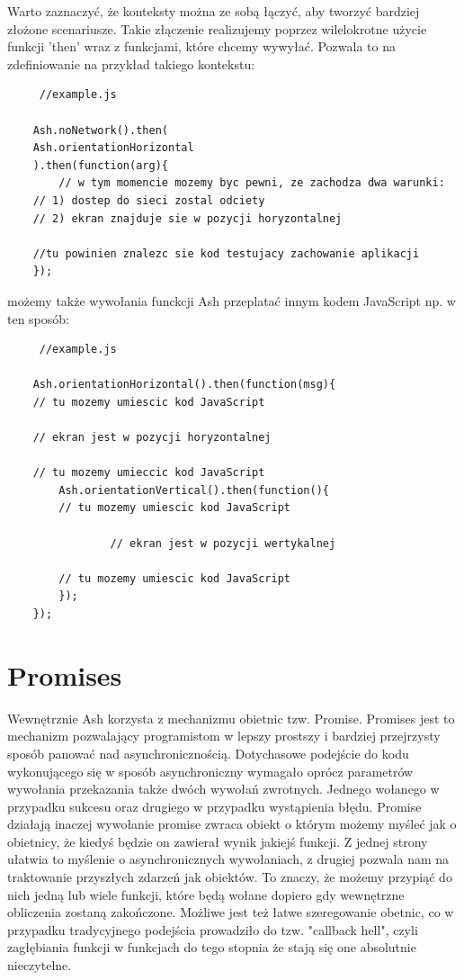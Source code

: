 \documentclass[brudnopis]{xmgr}
\begin{document}
Warto zaznaczyć, że konteksty można ze sobą łączyć, aby tworzyć bardziej złożone scenariusze. Takie złączenie realizujemy poprzez wilelokrotne użycie funkcji 'then' wraz z funkcjami, które chcemy wywyłać. Pozwala to na zdefiniowanie na przykład takiego kontekstu:

\begin{lstlisting}
     //example.js

    Ash.noNetwork().then(
	Ash.orientationHorizontal
    ).then(function(arg){
      	// w tym momencie mozemy byc pewni, ze zachodza dwa warunki:
	// 1) dostep do sieci zostal odciety 
	// 2) ekran znajduje sie w pozycji horyzontalnej

	//tu powinien znalezc sie kod testujacy zachowanie aplikacji 
    });
\end{lstlisting}

możemy także wywołania funckcji Ash przeplatać innym kodem JavaScript np. w ten sposób:

\begin{lstlisting}
     //example.js

    Ash.orientationHorizontal().then(function(msg){
	// tu mozemy umiescic kod JavaScript
      	
	// ekran jest w pozycji horyzontalnej
      
	// tu mozemy umieccic kod JavaScript
      	Ash.orientationVertical().then(function(){
		// tu mozemy umiescic kod JavaScript

        		// ekran jest w pozycji wertykalnej 

		// tu mozemy umiescic kod JavaScript
      	});
    });
\end{lstlisting}

\section{Promises}

Wewnętrznie Ash korzysta z mechanizmu obietnic tzw. Promise. Promises jest to mechanizm pozwalający programistom w lepszy prostszy i bardziej przejrzysty sposób panować nad  asynchronicznością. Dotychasowe podejście do kodu wykonującego się w sposób asynchroniczny wymagało oprócz parametrów wywołania przekazania także dwóch wywołań zwrotnych. Jednego wołanego w przypadku sukcesu oraz drugiego w przypadku wystąpienia błędu. Promise działają inaczej wywołanie promise zwraca obiekt o którym możemy myśleć jak o obietnicy, że kiedyś będzie on zawierał wynik jakiejś funkcji. Z jednej strony ułatwia to myślenie o asynchronicznych wywołaniach, z drugiej pozwala nam na traktowanie przyszłych zdarzeń jak obiektów. To znaczy, że możemy przypiąć do nich jedną lub wiele funkcji, które będą wołane dopiero gdy wewnętrzne obliczenia zostaną zakończone. Możliwe jest też łatwe szeregowanie obetnic, co w przypadku tradycyjnego podejścia prowadziło do tzw. "callback hell", czyli zagłębiania funkcji w funkcjach do tego stopnia że stają się one absolutnie nieczytelne. 
\end{document}
